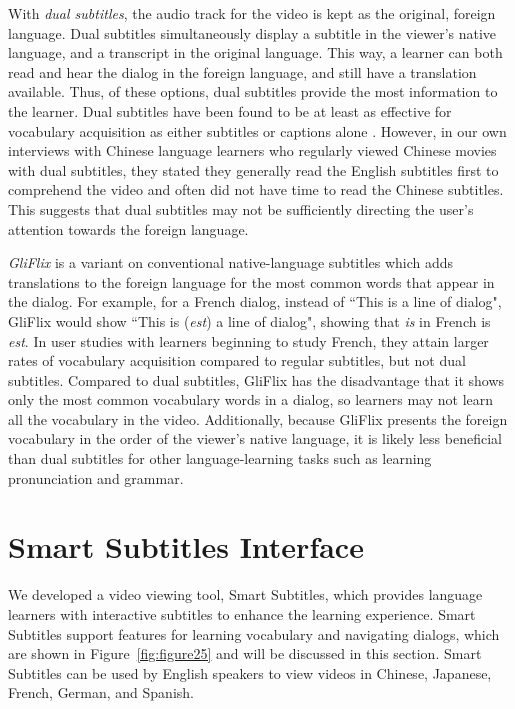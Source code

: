 \documentclass{sigchi}
\begin{document}
With \emph{dual subtitles}, the audio track for the video is kept as the original, foreign language.
Dual subtitles simultaneously display a subtitle in the viewer's native language, and a transcript in the original language. This way, a learner can both read and hear the dialog in the foreign language, and still have a translation
available. Thus, of these options, dual subtitles provide the most information to the learner.
Dual subtitles have been found to be at least as effective for vocabulary acquisition as
either subtitles or captions alone \cite{raine2012incidental}.
However, in our own interviews with Chinese language learners who regularly viewed Chinese movies
with dual subtitles, they stated they generally read the English subtitles first to comprehend the video and often did not have time to read the Chinese subtitles.
This suggests that dual subtitles may not be sufficiently
directing the user's attention
towards the foreign language.

\emph{GliFlix} \cite{gliflix} is a variant on conventional native-language subtitles which adds translations to the foreign language for the most common words that
appear in the dialog. For example, for a French dialog, instead of ``This is a line of dialog", GliFlix would show ``This is (\emph{est}) a line of dialog", showing that \emph{is} in French is \emph{est}. In user studies with learners beginning to study French, they attain larger rates of vocabulary acquisition compared to regular
subtitles, but not dual subtitles. Compared to dual subtitles, GliFlix has the disadvantage that it shows only the most common vocabulary words in a dialog, so learners may not learn all the vocabulary in the video. Additionally, because GliFlix presents the foreign vocabulary in the order of the viewer's native language, it is likely less beneficial than dual subtitles for
other language-learning tasks such as learning pronunciation and grammar.

\section{Smart Subtitles Interface}

We developed a video viewing tool, Smart Subtitles, which provides language learners with interactive subtitles to enhance the learning experience. Smart Subtitles support features for learning vocabulary and navigating dialogs, which are shown in Figure~\ref{fig:figure25} and will be discussed in this section. Smart Subtitles can be used by English speakers to view videos in Chinese, Japanese, French, German, and Spanish. %
\end{document}
